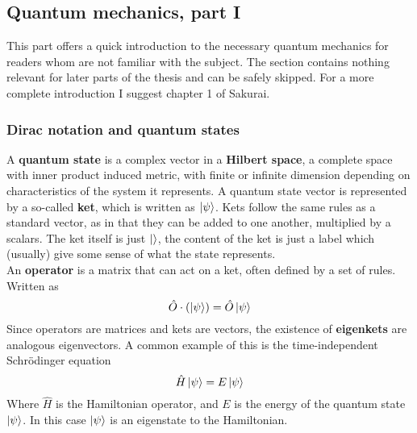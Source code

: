 \subsection{Quantum mechanics, part I}
This part offers a quick introduction to the necessary  quantum mechanics for readers whom are not familiar with the subject. The section contains nothing relevant for later parts of the thesis and can be safely skipped. For a more complete introduction I suggest chapter 1 of Sakurai.

\subsubsection{Dirac notation and quantum states}
A \textbf{quantum state} is a complex vector in a \textbf{Hilbert space}, a complete space with inner product induced metric, with finite or infinite dimension depending on characteristics of the system it represents. A quantum state vector is represented by a so-called \textbf{ket}, which is written as $\ket{\psi}$. Kets follow the same rules as a standard vector, as in that they can be added to one another, multiplied by a scalars. The ket itself is just $\ket{}$, the content of the ket is just a label which (usually) give some sense of what the state represents. \\
An \textbf{operator} is a matrix that can act on a ket, often defined by a set of rules. Written as 
\begin{equation}
\hat{O}\cdot (\ket{\psi}) = \hat{O}\ket{\psi}
\end{equation}
Since operators are matrices and kets are vectors, the existence of \textbf{eigenkets} are analogous eigenvectors. A common example of this is the time-independent Schrödinger equation
\begin{equation}
\hat{H}\ket{\psi} = E \ket{\psi}
\end{equation}
Where $\hat{H}$ is the Hamiltonian operator, and $E$ is the energy of the quantum state $\ket{\psi}$. In this case $\ket{\psi}$ is an eigenstate to the Hamiltonian.





